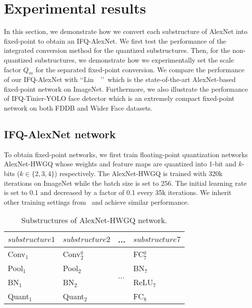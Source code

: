 \documentclass[10pt,twocolumn,letterpaper]{article}
\begin{document}
\section{Experimental results}

In this section, we demonstrate how we convert each substructure of AlexNet into fixed-point to obtain an IFQ-AlexNet. We first test the performance of the integrated conversion method for the quantized substructures. Then, for the non-quantized substructures, we demonstrate how we experimentally set the scale factor $Q_m$ for the separated fixed-point conversion. We compare the performance of our IFQ-AlexNet with \lq\lq Lin~\etal~\cite{LinFixPoint}\rq\rq\, which is the state-of-the-art AlexNet-based fixed-point network on ImageNet. Furthermore, we also illustrate the performance of IFQ-Tinier-YOLO face detector which is an extremely compact fixed-point network on both FDDB and Wider Face datasets.



\subsection{IFQ-AlexNet network}

To obtain fixed-point networks, we first train floating-point quantization networks AlexNet-HWGQ whose weights and feature maps are quantized into 1-bit and $k$-bits ($k\in\{2,3,4\}$) respectively. The AlexNet-HWGQ is trained with 320k iterations on ImageNet while the batch size is set to 256. The initial learning rate is set to 0.1 and decreased by a factor of 0.1 every 35k iterations. We inherit other training settings from~\cite{HWGQ} and achieve similar performance.



\begin{table}[!ht]
\centering
\caption{Substructures of AlexNet-HWGQ network.} \label{tab:AlexSubstructures}
\setlength{\tabcolsep}{2.0pt}
\begin{tabular}{p{}<{\centering}|p{}<{\centering}|p{}<{\centering}|p{}<{\centering}}
  \hline
         {$substructure1$} &{$substructure2$} & {...} &{$substructure7$} \\
  \hline\hline
         Conv$_1$          & Conv$^q_2$      &\multirow{4}{*}{...} &{FC$^q_7$} \\
         Pool$_1$          & Pool$_2$         &                     &{BN$_7$} \\
         BN$_1$            & BN$_2$           &                     &{ReLU$_7$}\\
         Quant$_1$         & Quant$_2$        &                     &{FC$_8$} \\
  \hline
\end{tabular}
\end{table}
\end{document}
